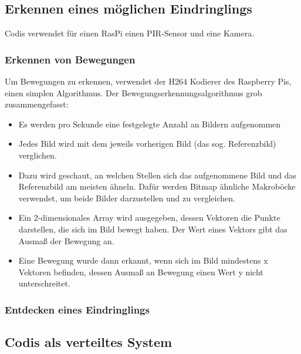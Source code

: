 \documentclass[journal]{IEEEtran}
\begin{document}
\subsection{Erkennen eines möglichen Eindringlings}

Codis verwendet für einen RasPi einen PIR-Sensor und eine Kamera. 

\subsubsection{Erkennen von Bewegungen}

Um Bewegungen zu erkennen, verwendet der H264 Kodierer des Raspberry Pis, einen simplen Algorithmus\cite{vektoren}. Der Bewegungserkennungsalgorithmus grob zusammengefasst:

\begin{itemize}
\item Es werden pro Sekunde eine festgelegte Anzahl an Bildern aufgenommen
\item Jedes Bild wird mit dem jeweils vorherigen Bild (das sog. Referenzbild) verglichen.
\item Dazu wird geschaut, an welchen Stellen sich das aufgenommene Bild und das Referenzbild am meisten ähneln. Dafür werden Bitmap ähnliche Makroböcke verwendet, um beide Bilder darzustellen und zu vergleichen.
\item Ein 2-dimensionales Array wird ausgegeben, dessen Vektoren die Punkte darstellen, die sich im Bild bewegt haben. Der Wert eines Vektors gibt das Ausmaß der Bewegung an.
\item Eine Bewegung wurde dann erkannt, wenn sich im Bild mindestens x Vektoren befinden, dessen Ausmaß an Bewegung einen Wert y nicht unterschreitet.
\end{itemize}

\subsubsection{Entdecken eines Eindringlings}


\subsection{Codis als verteiltes System}
\end{document}
